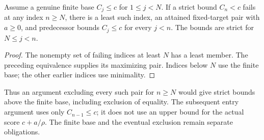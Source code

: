 \begin{corollary}\label{v9:core:first-failure}
Assume a genuine finite base $C_j\le c$ for $1\le j<N$. If a strict
bound $C_n<c$ fails at any index $n\ge N$, there is a least such index,
an attained fixed-target pair with $a\ge0$, and predecessor bounds
$C_j\le c$ for every $j<n$. The bounds are strict for $N\le j<n$.
\end{corollary}
\begin{proof}
The nonempty set of failing indices at least $N$ has a least member.
The preceding equivalence supplies its maximizing pair. Indices below
$N$ use the finite base; the other earlier indices use minimality.
\end{proof}
Thus an argument excluding every such pair for $n\ge N$ would give
strict bounds above the finite base, including exclusion of equality.
The subsequent entry argument uses only $C_{n-1}\le c$; it does not
use an upper bound for the actual score $c+a/\rho$. The finite base
and the eventual exclusion remain separate obligations.
